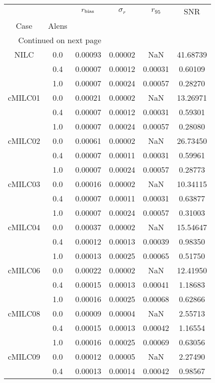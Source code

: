 \begin{longtable}{cccccc}
\toprule
     &     &  $r_{\rm bias}$  &  $\sigma_r$ &  $r_{95}$ &      SNR \\
Case & Alens &                  &             &           &          \\
\midrule
\endhead
\midrule
\multicolumn{3}{r}{{Continued on next page}} \\
\midrule
\endfoot

\bottomrule
\endlastfoot
NILC & 0.0 & 0.00093 & 0.00002 & NaN & 41.68739 \\
     & 0.4 & 0.00007 & 0.00012 & 0.00031 & 0.60109 \\
     & 1.0 & 0.00007 & 0.00024 & 0.00057 & 0.28270 \\
cMILC01 & 0.0 & 0.00021 & 0.00002 & NaN & 13.26971 \\
     & 0.4 & 0.00007 & 0.00012 & 0.00031 & 0.59301 \\
     & 1.0 & 0.00007 & 0.00024 & 0.00057 & 0.28080 \\
cMILC02 & 0.0 & 0.00061 & 0.00002 & NaN & 26.73450 \\
     & 0.4 & 0.00007 & 0.00011 & 0.00031 & 0.59961 \\
     & 1.0 & 0.00007 & 0.00024 & 0.00057 & 0.28773 \\
cMILC03 & 0.0 & 0.00016 & 0.00002 & NaN & 10.34115 \\
     & 0.4 & 0.00007 & 0.00011 & 0.00031 & 0.63877 \\
     & 1.0 & 0.00007 & 0.00024 & 0.00057 & 0.31003 \\
cMILC04 & 0.0 & 0.00037 & 0.00002 & NaN & 15.54647 \\
     & 0.4 & 0.00012 & 0.00013 & 0.00039 & 0.98350 \\
     & 1.0 & 0.00013 & 0.00025 & 0.00065 & 0.51750 \\
cMILC06 & 0.0 & 0.00022 & 0.00002 & NaN & 12.41950 \\
     & 0.4 & 0.00015 & 0.00013 & 0.00041 & 1.18683 \\
     & 1.0 & 0.00016 & 0.00025 & 0.00068 & 0.62866 \\
cMILC08 & 0.0 & 0.00009 & 0.00004 & NaN & 2.55713 \\
     & 0.4 & 0.00015 & 0.00013 & 0.00042 & 1.16554 \\
     & 1.0 & 0.00016 & 0.00025 & 0.00069 & 0.63056 \\
cMILC09 & 0.0 & 0.00012 & 0.00005 & NaN & 2.27490 \\
     & 0.4 & 0.00013 & 0.00014 & 0.00042 & 0.98567 \\

\end{longtable}
